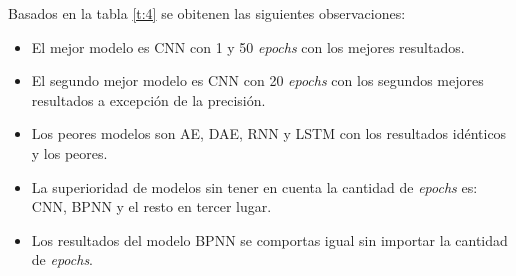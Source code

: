 Basados en la tabla \ref{t:4} se obitenen las siguientes observaciones:
\begin{itemize}
	\item El mejor modelo es CNN con 1 y 50 \textit{epochs} con los mejores resultados.
	\item El segundo mejor modelo es CNN con 20 \textit{epochs} con los segundos mejores resultados a excepci\'{o}n de la precisi\'{o}n.
	\item Los peores modelos son AE, DAE, RNN y LSTM con los resultados id\'{e}nticos y los peores.
	\item La superioridad de modelos sin tener en cuenta la cantidad de \textit{epochs} es: CNN, BPNN y el resto en tercer lugar.
	\item Los resultados del modelo BPNN se comportas igual sin importar la cantidad de \textit{epochs}.
\end{itemize}

